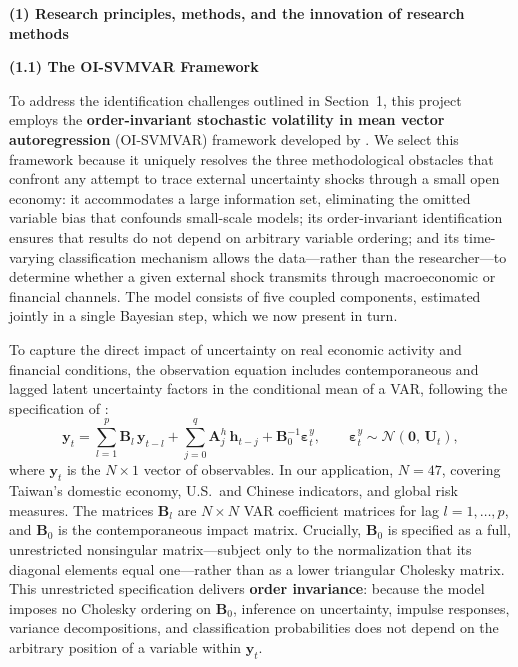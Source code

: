 
\noindent\textbf{(1) Research principles, methods, and the innovation of research methods}

\bigskip

\noindent\textbf{(1.1) The OI-SVMVAR Framework}

\medskip

To address the identification challenges outlined in Section~1, this project employs the \textbf{order-invariant stochastic volatility in mean vector autoregression} (OI-SVMVAR) framework developed by \citet{davidson2025investigating}. We select this framework because it uniquely resolves the three methodological obstacles that confront any attempt to trace external uncertainty shocks through a small open economy: it accommodates a large information set, eliminating the omitted variable bias that confounds small-scale models; its order-invariant identification ensures that results do not depend on arbitrary variable ordering; and its time-varying classification mechanism allows the data---rather than the researcher---to determine whether a given external shock transmits through macroeconomic or financial channels. The model consists of five coupled components, estimated jointly in a single Bayesian step, which we now present in turn.

To capture the direct impact of uncertainty on real economic activity and financial conditions, the observation equation includes contemporaneous and lagged latent uncertainty factors in the conditional mean of a VAR, following the specification of \citet{davidson2025investigating}:
%
\begin{equation}
\mathbf{y}_t = \sum_{l=1}^{p} \mathbf{B}_l\, \mathbf{y}_{t-l}
              + \sum_{j=0}^{q} \mathbf{A}_j^{h}\, \mathbf{h}_{t-j}
              + \mathbf{B}_0^{-1}\boldsymbol{\varepsilon}_t^{y},
\qquad
\boldsymbol{\varepsilon}_t^{y} \sim \mathcal{N}(\mathbf{0},\, \mathbf{U}_t),
\label{eq:var}
\end{equation}
%
where $\mathbf{y}_t$ is the $N \times 1$ vector of observables. In our application, $N = 47$, covering Taiwan’s domestic economy, U.S.\ and Chinese indicators, and global risk measures. The matrices $\mathbf{B}_l$ are $N \times N$ VAR coefficient matrices for lag $l = 1, \ldots, p$, and $\mathbf{B}_0$ is the contemporaneous impact matrix. Crucially, $\mathbf{B}_0$ is specified as a full, unrestricted nonsingular matrix---subject only to the normalization that its diagonal elements equal one---rather than as a lower triangular Cholesky matrix. This unrestricted specification delivers \textbf{order invariance}: because the model imposes no Cholesky ordering on $\mathbf{B}_0$, inference on uncertainty, impulse responses, variance decompositions, and classification probabilities does not depend on the arbitrary position of a variable within $\mathbf{y}_t$.

